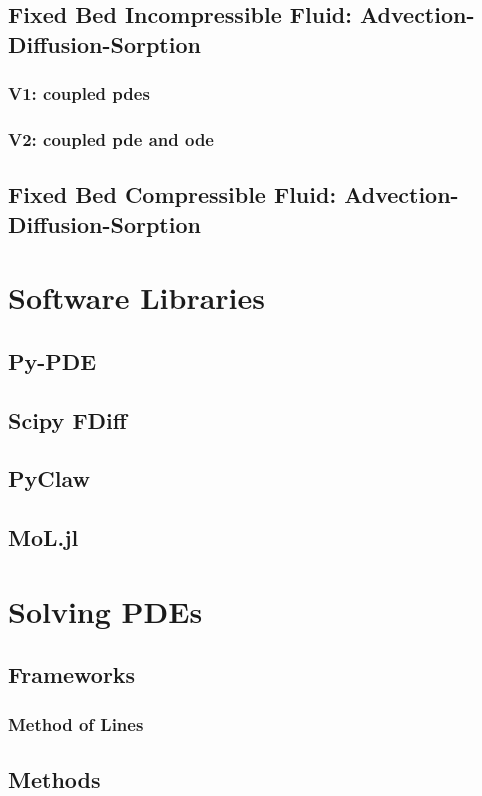 \documentclass{article}
\begin{document}
\subsection{Fixed Bed Incompressible Fluid: Advection-Diffusion-Sorption}
\subsubsection{V1: coupled pdes}
\subsubsection{V2: coupled pde and ode}
\subsection{Fixed Bed Compressible Fluid: Advection-Diffusion-Sorption}

\section{Software Libraries}
\subsection{Py-PDE}
\subsection{Scipy FDiff}
\subsection{PyClaw}
\subsection{MoL.jl}

\section{Solving PDEs}
\subsection{Frameworks}
\subsubsection{Method of Lines}

\subsection{Methods}
\end{document}
